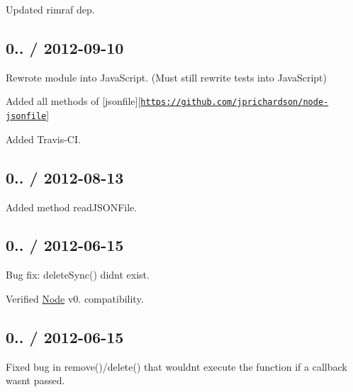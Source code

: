 \begin{DoxyItemize}
\item Updated {\ttfamily rimraf} dep.
\end{DoxyItemize}

\subsection*{0.. / 2012-\/09-\/10 }


\begin{DoxyItemize}
\item Rewrote module into Java\+Script. (Must still rewrite tests into Java\+Script)
\item Added all methods of \mbox{[}jsonfile\mbox{]}\mbox{[}\href{https://github.com/jprichardson/node-jsonfile}{\tt https\+://github.\+com/jprichardson/node-\/jsonfile}\mbox{]}
\item Added Travis-\/\+CI.
\end{DoxyItemize}

\subsection*{0.. / 2012-\/08-\/13 }


\begin{DoxyItemize}
\item Added method {\ttfamily read\+J\+S\+O\+N\+File}.
\end{DoxyItemize}

\subsection*{0.. / 2012-\/06-\/15 }


\begin{DoxyItemize}
\item Bug fix\+: {\ttfamily delete\+Sync()} didn\textquotesingle{}t exist.
\item Verified \mbox{\hyperlink{classNode}{Node}} v0. compatibility.
\end{DoxyItemize}

\subsection*{0.. / 2012-\/06-\/15 }


\begin{DoxyItemize}
\item Fixed bug in {\ttfamily remove()}/{\ttfamily delete()} that wouldn\textquotesingle{}t execute the function if a callback wasn\textquotesingle{}t passed.
\end{DoxyItemize}

